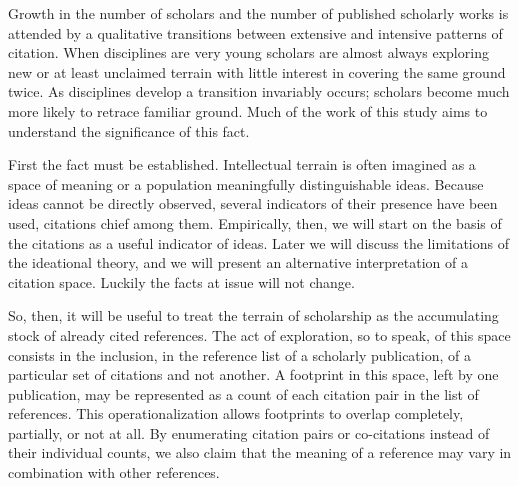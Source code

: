 \documentclass[]{article}
\begin{document}
Growth in the number of scholars and the number of published scholarly
works is attended by a qualitative transitions between extensive and
intensive patterns of citation. When disciplines are very young scholars
are almost always exploring new or at least unclaimed terrain with
little interest in covering the same ground twice. As disciplines
develop a transition invariably occurs; scholars become much more likely
to retrace familiar ground. Much of the work of this study aims to
understand the significance of this fact.

First the fact must be established. Intellectual terrain is often
imagined as a space of meaning or a population meaningfully
distinguishable ideas. Because ideas cannot be directly observed,
several indicators of their presence have been used, citations chief
among them. Empirically, then, we will start on the basis of the
citations as a useful indicator of ideas. Later we will discuss the
limitations of the ideational theory, and we will present an alternative
interpretation of a citation space. Luckily the facts at issue will not
change.

So, then, it will be useful to treat the terrain of scholarship as the
accumulating stock of already cited references. The act of exploration,
so to speak, of this space consists in the inclusion, in the reference
list of a scholarly publication, of a particular set of citations and
not another. A footprint in this space, left by one publication, may be
represented as a count of each citation pair in the list of references.
This operationalization allows footprints to overlap completely,
partially, or not at all. By enumerating citation pairs or co-citations
instead of their individual counts, we also claim that the meaning of a
reference may vary in combination with other references.
\end{document}
